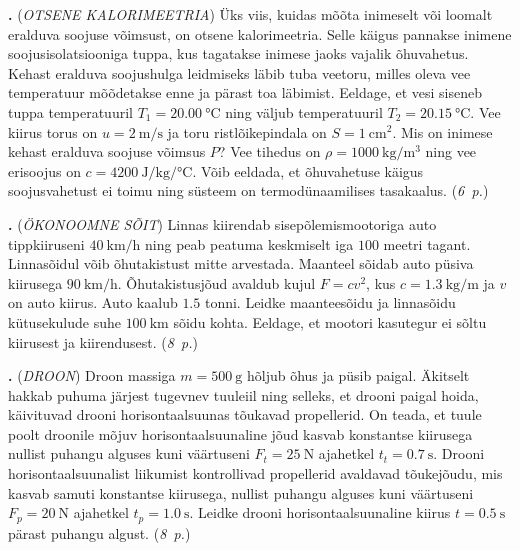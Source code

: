 \documentclass[11pt,a5paper]{article}
\newcommand{\numb}[1]{\vspace{5pt}\textbf{\large #1}}
\newcommand{\nimi}[1]{(\textsl{\small #1})}
\newcommand{\punktid}[1]{(\emph{#1~p.})}
\newcounter{ylesanne}
\newcommand{\yl}[1]{\addtocounter{ylesanne}{1}\numb{\theylesanne.} \nimi{#1} \newblock{}}
\newcommand{\autor}[1]{}%
\begin{document}
\yl{OTSENE KALORIMEETRIA}
Üks viis, kuidas mõõta inimeselt või loomalt eralduva soojuse võimsust, on otsene kalorimeetria. Selle käigus pannakse inimene soojusisolatsiooniga tuppa, kus tagatakse inimese jaoks vajalik õhuvahetus. Kehast eralduva soojushulga leidmiseks läbib tuba veetoru, milles oleva vee temperatuur mõõdetakse enne ja pärast toa läbimist. Eeldage, et vesi siseneb tuppa temperatuuril $T_1 = \SI{20.00}{\celsius}$ ning väljub temperatuuril $T_2 = \SI{20.15}{\celsius}$. Vee kiirus torus on $u = \SI{2}{\meter\per\second}$ ja toru ristlõikepindala on $S=\SI{1}{\cm\squared}$. Mis on inimese kehast eralduva soojuse võimsus $P$? Vee tihedus on $\rho = \SI{1000}{\kg\per\meter\cubed}$ ning vee erisoojus on $c = \SI{4200}{\joule\per\kilogram\per\celsius}$. Võib eeldada, et õhuvahetuse käigus soojusvahetust ei toimu ning süsteem on termodünaamilises tasakaalus.
\punktid{6} \autor{Konstantin Dukatš}

\yl{ÖKONOOMNE SÕIT}
Linnas kiirendab sisepõlemismootoriga auto tippkiiruseni $\SI{40}{\km\per\hour}$ ning peab peatuma keskmiselt iga $100$ meetri tagant. Linnasõidul võib õhutakistust mitte arvestada. Maanteel sõidab auto püsiva kiirusega $\SI{90}{\km\per\hour}$. Õhutakistusjõud avaldub kujul $F=cv^2$, kus $c = \SI{1.3}{\kg\per\meter}$ ja $v$ on auto kiirus. Auto kaalub $\num{1.5}$ tonni. Leidke maanteesõidu ja linnasõidu kütusekulude suhe $\SI{100}{\km}$ sõidu kohta. Eeldage, et mootori kasutegur ei sõltu kiirusest ja kiirendusest.
\punktid{8} \autor{Marten Rannut}

\yl{DROON}
Droon massiga $m=\SI{500}\g$ hõljub õhus ja püsib paigal. Äkitselt hakkab puhuma järjest tugevnev tuuleiil ning selleks, et drooni paigal hoida, käivituvad drooni horisontaalsuunas tõukavad propellerid. On teada, et tuule poolt droonile mõjuv horisontaalsuunaline jõud kasvab konstantse kiirusega nullist puhangu alguses kuni väärtuseni $F_t=\SI{25}\N$ ajahetkel $t_t= \SI{0.7}\s$. Drooni horisontaalsuunalist liikumist kontrollivad propellerid avaldavad tõukejõudu, mis kasvab samuti konstantse kiirusega, nullist puhangu alguses kuni väärtuseni $F_p=\SI{20}\N$ ajahetkel $t_p= \SI{1.0}\s$. Leidke drooni horisontaalsuunaline kiirus $t=\SI{0.5}\s$ pärast puhangu algust.
\punktid{8} \autor{Marten Rannut}
\end{document}

